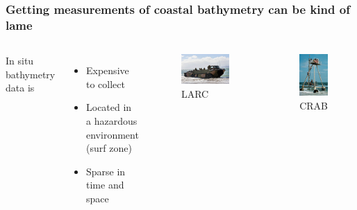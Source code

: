 \documentclass[7pt]{beamer}
\begin{document}
\begin{frame}
\frametitle{Getting measurements of coastal bathymetry can be kind of lame}
\begin{columns}
In situ bathymetry data is
\begin{itemize}
 \item Expensive to collect
 \item Located in a hazardous environment (surf zone)
 \item Sparse in time and space
\end{itemize}
\begin{figure}[h!]
\includegraphics[width=.60\linewidth]{img/LARC2.jpg}\hfill
\centering
\captionsetup{labelformat=empty}
\caption{LARC}
\end{figure}
\begin{figure}[h]
\includegraphics[width=.6\linewidth]{img/CRAB3.JPG}
\captionsetup{labelformat=empty}
\caption{CRAB}
\end{figure}


\end{columns}

\end{frame}
\end{document}
